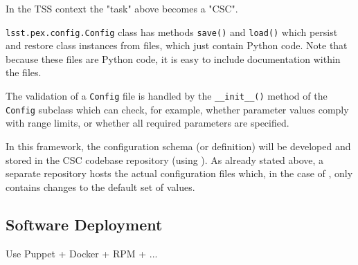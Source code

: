 In the TSS context the "task" above becomes a "CSC". 

\texttt{lsst.pex.config.Config} class has methods \texttt{save()} and \texttt{load()} which persist and restore class instances from files, which just contain Python code. Note that because these files are Python code, it is easy to include documentation within the files.

The validation of a \texttt{Config} file is handled by the \texttt{\_\_init\_\_()} method of the \texttt{Config} subclass which can check, for example, whether parameter values comply with range limits, or whether all required parameters are specified.

In this framework, the configuration schema (or definition) will be developed and stored in the CSC codebase repository (using \pexC). As already stated above, a separate repository hosts the actual configuration files which, in the case of \pexC, only contains changes to the default set of values.



%


\subsection{Software Deployment}\label{sect:deploy}

Use Puppet + Docker +  RPM + ...














